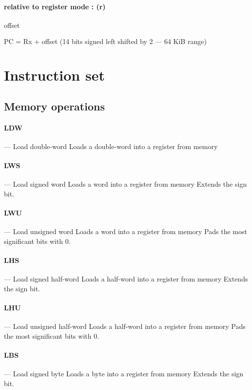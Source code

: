 \documentclass[11pt]{article}
\begin{document}
\paragraph{relative to register mode : (r)}
offset

PC = Rx + offset (14 bits signed left shifted by 2 --- 64 KiB range)

\newpage
\section{Instruction set}
\subsection{Memory operations}

\paragraph{LDW} --- Load double-word \newline
Loads a double-word into a register from memory

\paragraph{LWS} --- Load signed word \newline
Loads a word into a register from memory
Extends the sign bit.

\paragraph{LWU} --- Load unsigned word\newline
Loads a word into a register from memory
Pads the most significant bits with 0.

\paragraph{LHS} --- Load signed half-word \newline
Loads a half-word into a register from memory
Extends the sign bit.

\paragraph{LHU} --- Load unsigned half-word\newline
Loads a half-word into a register from memory
Pads the most significant bits with 0.

\paragraph{LBS} --- Load signed byte\newline
Loads a byte into a register from memory
Extends the sign bit.
\end{document}
